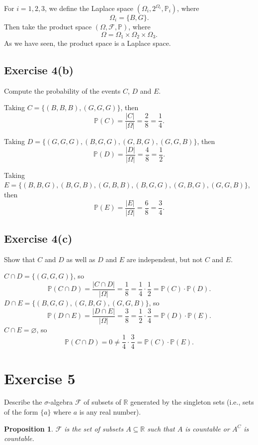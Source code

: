 \documentclass[12pt]{article}
\newtheorem{proposition}{Proposition}
\newenvironment{problem}
    {\begin{lrbox}{\mybox}\begin{minipage}{\textwidth-10pt}}
    {\end{minipage}\end{lrbox}\framebox[\textwidth]{\usebox{\mybox}}}
\newcommand{\R}{\mathbb{R}}
\let\emptyset\varnothing
\newcommand{\FF}{\mathcal{F}}
\renewcommand{\P}{\mathbb{P}}
\begin{document}
For $i=1,2,3$, we define the Laplace space $(\Omega_i,2^{\Omega_i},\P_i)$, where
\[\Omega_i = \{B,G\}.\]
Then take the product space $(\Omega, \FF, \P)$, where
\[\Omega = \Omega_1 \times \Omega_2 \times \Omega_3.\]
As we have seen, the product space is a Laplace space.

\subsection*{Exercise 4(b)}
\begin{problem}
    Compute the probability of the events $C$, $D$ and $E$.
\end{problem}
\medskip

Taking $C = \{(B,B,B),(G,G,G)\}$, then
\[\P(C) = \frac{|C|}{|\Omega|}  = \frac{2}{8} = \frac14.\]

Taking $D = \{(G,G,G),(B,G,G),(G,B,G),(G,G,B)\}$, then
\[\P(D) = \frac{|D|}{|\Omega|} = \frac{4}{8} = \frac12.\]

Taking $E = \{(B,B,G),(B,G,B),(G,B,B),(B,G,G),(G,B,G),(G,G,B)\}$, then
\[\P(E) = \frac{|E|}{|\Omega|}  = \frac{6}{8} = \frac34.\]

\subsection*{Exercise 4(c)}
\begin{problem}
    Show that $C$ and $D$ as well as $D$ and $E$ are independent, but not $C$ and $E$.
\end{problem}
\medskip

$C\cap D = \{(G,G,G)\}$, so
\[\P(C\cap D) = \frac{|C\cap D|}{|\Omega|} = \frac18 = \frac14 \cdot \frac12 = \P(C)\cdot\P(D).\]
$D\cap E = \{(B,G,G),(G,B,G),(G,G,B)\}$, so
\[\P(D\cap E) = \frac{|D\cap E|}{|\Omega|} = \frac38 = \frac12 \cdot \frac34 = \P(D)\cdot\P(E).\]
$C\cap E = \emptyset$, so
\[\P(C\cap D) = 0 \ne \frac14\cdot \frac34 = \P(C) \cdot \P(E).\] 

\newpage
\section*{Exercise 5}
\begin{problem}
    Describe the $\sigma$-algebra $\FF$ of subsets of $\R$ generated by the singleton sets (i.e., sets of the form $\{a\}$ where $a$ is any real number).
\end{problem}

\begin{proposition}
    $\FF$ is the set of subsets $A\subseteq\R$ such that $A$ is countable or $A^C$ is countable.
\end{proposition}
\end{document}
